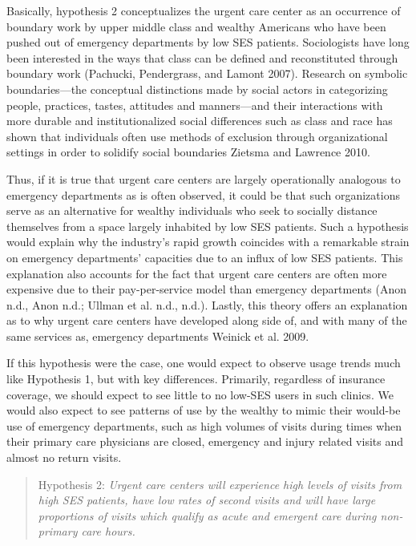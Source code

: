 \documentclass[12pt,twoside]{reedthesis}
\begin{document}
  Basically, hypothesis 2 conceptualizes the urgent care center as an
  occurrence of boundary work by upper middle class and wealthy Americans
  who have been pushed out of emergency departments by low SES patients.
  Sociologists have long been interested in the ways that class can be
  defined and reconstituted through boundary work (Pachucki, Pendergrass,
  and Lamont 2007). Research on symbolic boundaries---the conceptual
  distinctions made by social actors in categorizing people, practices,
  tastes, attitudes and manners---and their interactions with more durable
  and institutionalized social differences such as class and race has
  shown that individuals often use methods of exclusion through
  organizational settings in order to solidify social boundaries Zietsma
  and Lawrence 2010.
  
  Thus, if it is true that urgent care centers are largely operationally
  analogous to emergency departments as is often observed, it could be
  that such organizations serve as an alternative for wealthy individuals
  who seek to socially distance themselves from a space largely inhabited
  by low SES patients. Such a hypothesis would explain why the industry's
  rapid growth coincides with a remarkable strain on emergency
  departments' capacities due to an influx of low SES patients. This
  explanation also accounts for the fact that urgent care centers are
  often more expensive due to their pay-per-service model than emergency
  departments (Anon n.d., Anon n.d.; Ullman et al. n.d., n.d.). Lastly,
  this theory offers an explanation as to why urgent care centers have
  developed along side of, and with many of the same services as,
  emergency departments Weinick et al. 2009.
  
  If this hypothesis were the case, one would expect to observe usage
  trends much like Hypothesis 1, but with key differences. Primarily,
  regardless of insurance coverage, we should expect to see little to no
  low-SES users in such clinics. We would also expect to see patterns of
  use by the wealthy to mimic their would-be use of emergency departments,
  such as high volumes of visits during times when their primary care
  physicians are closed, emergency and injury related visits and almost no
  return visits.
  
  \begin{quote}
  Hypothesis 2: \emph{Urgent care centers will experience high levels of
  visits from high SES patients, have low rates of second visits and will
  have large proportions of visits which qualify as acute and emergent
  care during non-primary care hours.}
  \end{quote}
  
\end{document}

